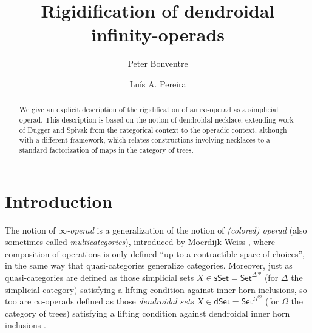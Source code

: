 \documentclass{hha}
\theoremstyle{definition} %
\begin{document}
\title{Rigidification of dendroidal infinity-operads}

\author{Peter Bonventre}
\address{Department of Mathematics and Computer Science,
  College of the Holy Cross,
  Worcester, MA, 01610}

\author{Lu\'is A. Pereira}%
\address{TBD} %


\begin{abstract}
	We give an explicit description
	of the rigidification of an $\infty$-operad
	as a simplicial operad.
	This description is based on the notion of 
	dendroidal necklace, 
	extending work of 
	Dugger and Spivak
	from the categorical context to 
	the operadic context,
	although with a different framework,
	which relates constructions involving necklaces 
	to a standard factorization
	of maps in the category of trees.
\end{abstract}




\maketitle








\section{Introduction}

The notion of \emph{$\infty$-operad} is a generalization of the notion of \emph{(colored) operad}
(also sometimes called \emph{multicategories}),
introduced by Moerdijk-Weiss \cite{MW07},
where composition of operations is only defined 
``up to a contractible space of choices'',
in the same way that quasi-categories generalize categories.
Moreover, just as quasi-categories are defined as those simplicial sets 
$X \in \mathsf{sSet} = \mathsf{Set}^{\Delta^{op}}$
(for $\Delta$ the simplicial category)
satisfying a lifting condition against inner horn inclusions,
so too are $\infty$-operads defined as those \emph{dendroidal sets}
$X \in \mathsf{dSet} = \mathsf{Set}^{\Omega^{op}}$
(for $\Omega$ the category of trees)
satisfying a lifting condition against 
dendroidal inner horn inclusions \cite[\S 2.1]{CM11}.
\end{document}

